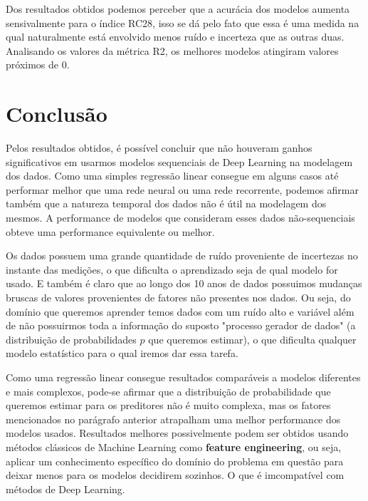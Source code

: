 \documentclass[a4paper]{article}
\begin{document}
\bigskip

Dos resultados obtidos podemos perceber que a acurácia dos modelos aumenta sensivalmente para o índice RC28, isso se dá pelo fato que essa é uma medida na qual naturalmente está envolvido menos ruído e incerteza que as outras duas. Analisando os valores da métrica R2, os melhores modelos atingiram valores próximos de $0$.




\section{Conclusão}

Pelos resultados obtidos, é possível concluir que não houveram ganhos significativos em usarmos modelos sequenciais de Deep Learning na modelagem dos dados. Como uma simples regressão linear consegue em alguns casos até performar melhor que uma rede neural ou uma rede recorrente, podemos afirmar também que a natureza temporal dos dados não é útil na modelagem dos mesmos. A performance de modelos que consideram esses dados não-sequenciais obteve uma performance equivalente ou melhor.

Os dados possuem uma grande quantidade de ruído proveniente de incertezas no instante das medições, o que dificulta o aprendizado seja de qual modelo for usado. E também é claro que ao longo dos 10 anos de dados possuimos mudanças bruscas de valores provenientes de fatores não presentes nos dados. Ou seja, do domínio que queremos aprender temos dados com um ruído alto e variável além de não possuirmos toda a informação do suposto "processo gerador de dados" (a distribuição de probabilidades $p$ que queremos estimar), o que dificulta qualquer modelo estatístico para o qual iremos dar essa tarefa.

Como uma regressão linear consegue resultados comparáveis a modelos diferentes e mais complexos, pode-se afirmar que a distribuição de probabilidade que queremos estimar para os preditores não é muito complexa, mas os fatores mencionados no parágrafo anterior atrapalham uma melhor performance dos modelos usados. Resultados melhores possivelmente podem ser obtidos usando métodos clássicos de Machine Learning como \textbf{feature engineering}, ou seja, aplicar um conhecimento específico do domínio do problema em questão para deixar menos para os modelos decidirem sozinhos. O que é imcompatível com métodos de Deep Learning. 
\end{document}
